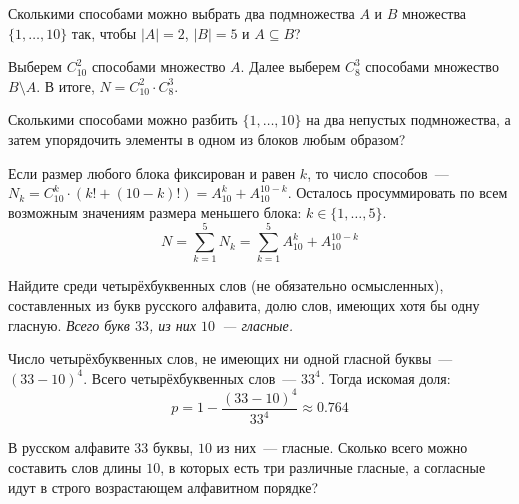 \begin{Exercise}[counter=SecExercise]
    \noindent
    Сколькими способами можно выбрать два подмножества $ A $ и $ B $ множества $ \{1, \ldots, 10 \} $ так, чтобы $ |A| = 2 $, $ |B| = 5 $ и $ A \subseteq B $?
\end{Exercise}

\begin{Answer}
    \noindent
    Выберем $ C_{10}^2 $ способами множество $ A $.
    Далее выберем $ C_8^3 $ способами множество $ B \setminus A $.
    В итоге, $ N = C_{10}^2 \cdot C_8^3 $.
\end{Answer}


\begin{Exercise}[counter=SecExercise]
    \noindent
    Сколькими способами можно разбить $ \{ 1, \ldots, 10 \} $ на два непустых подмножества, а затем упорядочить элементы в одном из блоков любым образом?
\end{Exercise}

\begin{Answer}
    \noindent
    Если размер любого блока фиксирован и равен $ k $, то число способов~--- $ N_k = C_{10}^k \cdot (k! + (10 - k)!) = A_{10}^k + A_{10}^{10-k} $.
    Осталось просуммировать по всем возможным значениям размера меньшего блока: $ k \in \{1, \ldots, 5 \} $.
    \[
        N = \sum_{k=1}^5 N_k = \sum_{k=1}^5 A_{10}^k + A_{10}^{10-k}
    \]
\end{Answer}


\begin{Exercise}[counter=SecExercise, label={exercise:combinatorics:at_least_one_vowel}]
    \noindent
    Найдите среди четырёхбуквенных слов (не обязательно осмысленных), составленных из букв русского алфавита,
    долю слов, имеющих хотя бы одну гласную.
    \newline
    \textit{Всего букв $ 33 $, из них $ 10 $~--- гласные.}
\end{Exercise}

\begin{Answer}
    \noindent
    Число четырёхбуквенных слов, не имеющих ни одной гласной буквы~--- $ (33 - 10)^4 $.
    Всего четырёхбуквенных слов~--- $ 33^4 $.
    Тогда искомая доля:
    \[
        p = 1 - \frac{(33 - 10)^4}{33^4} \approx 0.764
    \]
\end{Answer}


\begin{Exercise}[counter=SecExercise]
    \noindent
    В русском алфавите $ 33 $ буквы, $ 10 $ из них~--- гласные.
    Сколько всего можно составить слов длины $ 10 $, в которых есть три различные гласные, а согласные идут в строго возрастающем алфавитном порядке?
\end{Exercise}

